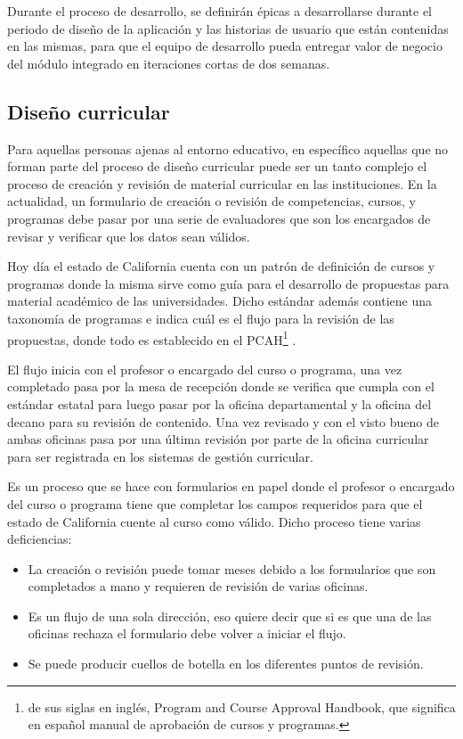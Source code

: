 Durante el proceso de desarrollo, se definirán épicas a desarrollarse durante el periodo de diseño de la aplicación y las historias de usuario que están contenidas en las mismas, para que el equipo de desarrollo pueda entregar valor de negocio del módulo integrado en iteraciones cortas de dos semanas.

\subsection{Diseño curricular}
Para aquellas personas ajenas al entorno educativo, en específico aquellas que no forman parte del proceso de diseño curricular puede ser un tanto complejo el proceso de creación y revisión de material curricular en las instituciones. En la actualidad, un formulario de creación o revisión de competencias, cursos, y programas debe pasar por una serie de evaluadores que son los encargados de revisar y verificar que los datos sean válidos.

Hoy día el estado de California cuenta con un patrón de definición de cursos y programas donde la misma sirve como guía para el desarrollo de propuestas para material académico de las universidades. Dicho estándar además contiene una taxonomía de programas e indica cuál es el flujo para la revisión de las propuestas, donde todo es establecido en el PCAH\footnote{de sus siglas en inglés, Program and Course Approval Handbook, que significa en español manual de aprobación de cursos y programas.} \citep{brice_w_harris_program_2013}.

El flujo inicia con el profesor o encargado del curso o programa, una vez completado pasa por la mesa de recepción donde se verifica que cumpla con el estándar estatal para luego pasar por la oficina departamental y la oficina del decano para su revisión de contenido. Una vez revisado y con el visto bueno de ambas oficinas pasa por una última revisión por parte de la oficina curricular para ser registrada en los sistemas de gestión curricular.

Es un proceso que se hace con formularios en papel donde el profesor o encargado del curso o programa tiene que completar los campos requeridos para que el estado de California cuente al curso como válido. Dicho proceso tiene varias deficiencias:
\begin{itemize}
	\item La creación o revisión puede tomar meses debido a los formularios que son completados a mano y requieren de revisión de varias oficinas.
	\item Es un flujo de una sola dirección, eso quiere decir que si es que una de las oficinas rechaza el formulario debe volver a iniciar el flujo.
	\item Se puede producir cuellos de botella en los diferentes puntos de revisión.
\end{itemize}

